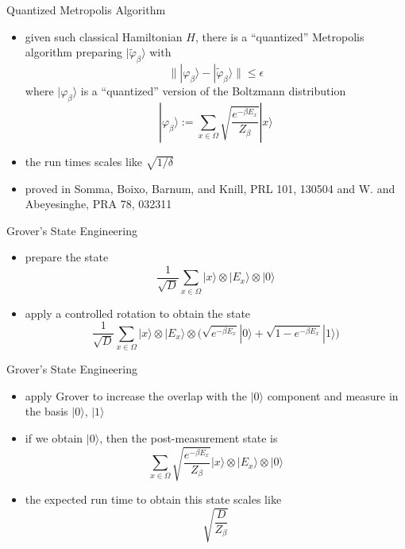 \documentclass[slideColor]{prosper}
\renewcommand{\>}{\rangle}
\newcommand{\<}{\langle}
\begin{document}

\begin{slide}{Quantized Metropolis Algorithm}
\begin{itemize}
\item given such classical Hamiltonian $H$, there is a ``quantized'' Metropolis algorithm preparing $|\tilde{\varphi}_\beta\>$ with
\[
\big\| |\varphi_\beta\> - |\tilde{\varphi}_\beta\> \big\| \le \epsilon
\]
where $|\varphi_\beta\>$ is a ``quantized'' version of the Boltzmann distribution
\[
|\varphi_\beta\> := \sum_{x\in \Omega} \sqrt{\frac{e^{-\beta E_x}}{Z_\beta}} |x\>
\]

\item the run times scales like $\sqrt{1/\delta}$

\medskip
\item 
proved in Somma, Boixo, Barnum, and Knill, PRL 101, 130504 and W. and Abeyesinghe, PRA 78, 032311
\end{itemize}
\end{slide}


\begin{slide}{Grover's State Engineering}
\begin{itemize}
\item prepare the state 
\[
\frac{1}{\sqrt{D}}\sum_{x\in\Omega} |x\> \otimes |E_x\> \otimes |0\>
\]

\bigskip
\item apply a controlled rotation to obtain the state
\[
\frac{1}{\sqrt{D}}\sum_{x\in\Omega} |x\> \otimes |E_x\> \otimes \Big( \sqrt{e^{-\beta E_x}} |0\> + \sqrt{1-e^{-\beta E_x}} |1\> \Big)
\]

\end{itemize}
\end{slide}


\begin{slide}{Grover's State Engineering}
\begin{itemize}

\item apply Grover to increase the overlap with the $|0\>$ component and measure in the basis $|0\>$, $|1\>$ 


\medskip
\item if we obtain $|0\>$, then the post-measurement state is
\[
\sum_{x\in\Omega} \sqrt{\frac{e^{-\beta E_x}}{Z_\beta}} |x\> \otimes |E_x\> \otimes  |0\> 
\]

\medskip
\item the expected run time to obtain this state scales like
\[
\sqrt{\frac{D}{Z_\beta}}
\]

\end{itemize}
\end{slide}
\end{document}
